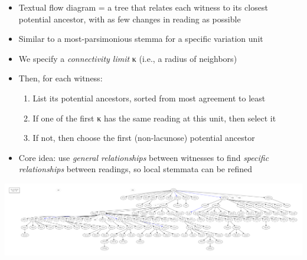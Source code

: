 \documentclass[10pt]{beamer}
\begin{document}
	\begin{frame}
		\begin{itemize}
			\item Textual flow diagram = a tree that relates each witness to its closest potential ancestor, with as few changes in reading as possible
			\item Similar to a most-parsimonious stemma for a specific variation unit
			\item We specify a \emph{connectivity limit} {\renewfontfamily{}\textgreek{κ}} (i.e., a radius of  neighbors)
			\item Then, for each witness:
			\begin{enumerate}
				\item List its potential ancestors, sorted from most agreement to least
				\item If one of the first {\renewfontfamily{}\textgreek{κ}} has the same reading at this unit, then select it
				\item If not, then choose the first (non-lacunose) potential ancestor
			\end{enumerate}
			\item Core idea: use \emph{general relationships} between witnesses to find \emph{specific relationships} between readings, so local stemmata can be refined
		\end{itemize}
		\begin{center}
			\includegraphics[width=\textwidth]{../img/B25K1V13U24-26-textual-flow.pdf}
		\end{center}
	\end{frame}
\end{document}

